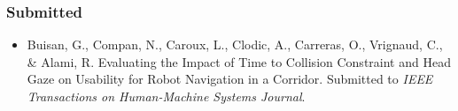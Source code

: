 \documentclass[a4paper,11pt,twoside]{StyleThese}
\begin{document}
\subsubsection*{Submitted}

\begin{itemize}
\item Buisan, G., Compan, N., Caroux, L., Clodic, A., Carreras, O., Vrignaud, C., \& Alami, R. Evaluating the Impact of Time to Collision Constraint and Head Gaze on Usability for Robot Navigation in a Corridor. Submitted to \textit{IEEE Transactions on Human-Machine Systems Journal}.
\end{itemize}





 

\ifdefined{}
\else


\end{document}
